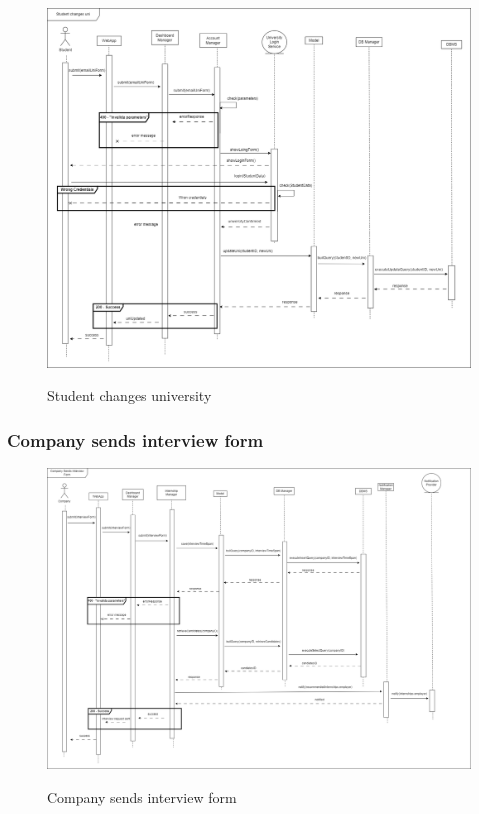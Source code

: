 \documentclass[a4paper,12pt]{article}
\begin{document}
\begin{figure}[H]
\centering
\includegraphics[scale = 0.35]{DD_figures/RuntimeView/StudentChangesUniversityRV.drawio.png}\\
\caption{Student changes university}
\end{figure}

\subsubsection*{Company sends interview form}

\begin{figure}[H]
\centering
\includegraphics[scale = 0.30]{DD_figures/RuntimeView/CompanySendsInterviewFormRV.drawio.png}\\
\caption{Company sends interview form}
\end{figure}
\end{document}
